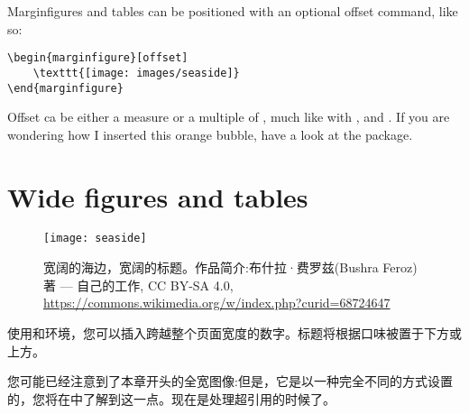 Marginfigures and tables can be positioned with an optional offset 
command, like so:

\begin{lstlisting}
\begin{marginfigure}[offset]
	\texttt{[image: images/seaside]}
\end{marginfigure}
\end{lstlisting}

Offset ca be either a measure or a multiple of , 
much like with ,  and 
. If you are wondering how I 
inserted this orange bubble, have a look at the  package.

\section{Wide figures and tables}

\begin{figure*}[h!]
	\texttt{[image: seaside]}
	\caption[一个宽阔的海边]{宽阔的海边，宽阔的标题。作品简介:布什拉·费罗兹(Bushra Feroz)著 --- 自己的工作, CC BY-SA 4.0, 
		\url{https://commons.wikimedia.org/w/index.php?curid=68724647}}
\end{figure*}

使用和环境，您可以插入跨越整个页面宽度的数字。标题将根据口味被置于下方或上方。

您可能已经注意到了本章开头的全宽图像:但是，它是以一种完全不同的方式设置的，您将在中了解到这一点。现在是处理超引用的时候了。

